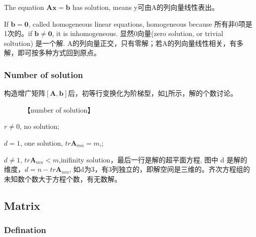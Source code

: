 \documentclass[UTF8]{../../09-Mathematics}
\begin{document}
The equation $\boldsymbol A \boldsymbol x = \boldsymbol b$ has solution, means y可由A的列向量线性表出。

If $\boldsymbol b = \boldsymbol 0$, called homogeneous linear equations, homogeneous because 所有非0项是1次的。if $\boldsymbol b \neq \boldsymbol 0$, it is inhomogeneous. 显然0向量(zero solution, or trivial soltution) 是一个解. A的列向量正交，只有零解；若A的列向量线性相关，有多解，即可按多种方式回到原点。

\subsubsection{Number of solution}

构造增广矩阵$[\boldsymbol A,\boldsymbol b ]$后，初等行变换化为阶梯型，如\ref{fig:number_of_solution}所示，解的个数讨论。

\begin{figure}[h]
  \centering
  \caption{【number of solution】}\label{fig:number_of_solution}
\end{figure}

$r \neq 0$, no solution;

$d = 1$, one solution, $tr \boldsymbol A_{mn} = m$,;

$d \neq 1$, $tr \boldsymbol A_{mn} < m$,inifinity solution，最后一行是解的超平面方程, 图中 d 是解的维度，$d =  n -tr \boldsymbol A_{mn}$, 如d为3，有3列独立的，即解空间是三维的。齐次方程组的未知数个数大于方程个数，有无数解。


\subsection{Matrix}


\subsubsection{Defination}
\end{document}
